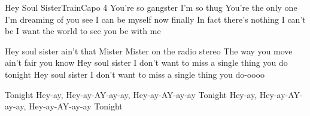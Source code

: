 \begin{song}{Hey Soul Sister}{Train}{Capo 4}
You're so gangster I'm so thug
You're the only one I'm dreaming of you see
I can be myself now finally
In fact there's nothing I can't be
I want the world to see you be with   me

Hey soul sister ain't that Mister Mister on the radio stereo
The way you move ain't fair you know
Hey soul sister I don't want to miss a single thing you do tonight
Hey soul sister I don't want to miss a single thing you do-oooo

Tonight Hey-ay, Hey-ay-AY-ay-ay, Hey-ay-AY-ay-ay
Tonight Hey-ay, Hey-ay-AY-ay-ay, Hey-ay-AY-ay-ay
Tonight
\end{song}
